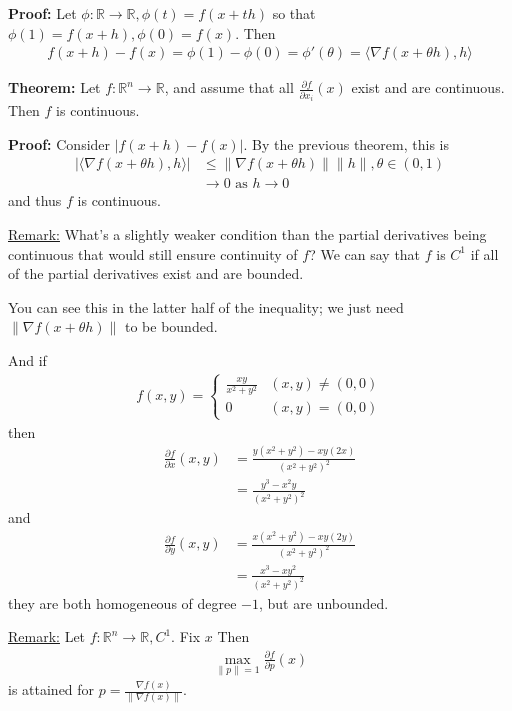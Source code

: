 \documentclass{article}
\newcommand*{\txt}[1]{\text{ #1 }}%
\newcommand*{\iprod}[1]{\langle #1 \rangle}
\newcommand*{\rr}{\mathbb{R}}%
\begin{document}
\textbf{Proof:} Let $\phi:\rr\to\rr,\phi(t)=f(x+th)$ so that $\phi(1)=f(x+h),\phi(0)=f(x)$. Then \begin{align*}
    f(x+h)-f(x)=\phi(1)-\phi(0)=\phi'(\theta)=\iprod{\nabla f(x+\theta h),h}
\end{align*}

\textbf{Theorem:} Let $f:\rr^n\to \rr$, and assume that all $\frac{\partial f}{\partial x_i}(x)$ exist and are continuous. Then $f$ is continuous. 

\textbf{Proof:} Consider $|f(x+h)-f(x)|$. By the previous theorem, this is \begin{align*}
    |\iprod{\nabla f(x+\theta h),h}|&\leq \|\nabla f(x+\theta h)\|\|h\|,\theta\in (0,1)\\
    &\to 0\txt{as} h\to 0
\end{align*} and thus $f$ is continuous.

\underline{Remark:} What's a slightly weaker condition than the partial derivatives being continuous that would still ensure continuity of $f$? We can say that $f$ is $C^1$ if all of the partial derivatives exist and are bounded.

You can see this in the latter half of the inequality; we just need $\|\nabla f(x+\theta h)\|$ to be bounded.

And if \begin{align*}
    f(x,y)=\begin{cases}
        \frac{xy}{x^2+y^2} & (x,y)\neq (0,0)\\
        0 & (x,y)=(0,0)
    \end{cases}
\end{align*} then \begin{align*}
    \frac{\partial f}{\partial x}(x,y)&=\frac{y(x^2+y^2)-xy(2x)}{(x^2+y^2)^2}\\
    &=\frac{y^3-x^2y}{(x^2+y^2)^2}
\end{align*} and \begin{align*}
    \frac{\partial f}{\partial y}(x,y)&=\frac{x(x^2+y^2)-xy(2y)}{(x^2+y^2)^2}\\
    &=\frac{x^3-xy^2}{(x^2+y^2)^2}
\end{align*} they are both homogeneous of degree $-1$, but are unbounded. 

\underline{Remark:} Let $f:\rr^n\to\rr, C^1$. Fix $x$ Then \begin{align*}
    \max_{\|p\|=1}\frac{\partial f}{\partial p}(x)
\end{align*} is attained for $p=\frac{\nabla f(x)}{\|\nabla f(x)\|}$.
\end{document}
